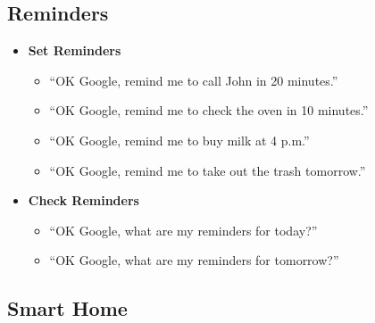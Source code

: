 \documentclass[
  jou,
  floatsintext,
  longtable,
  a4paper,
  nolmodern,
  notxfonts,
  notimes,
  12pt,
  colorlinks=true,linkcolor=blue,citecolor=blue,urlcolor=blue]{apa7}
\providecommand{\tightlist}{%
  \setlength{\itemsep}{0pt}\setlength{\parskip}{0pt}}
\begin{document}
\subsection{Reminders}\label{reminders}

\begin{itemize}
\tightlist
\item
  \textbf{Set Reminders}

  \begin{itemize}
  \tightlist
  \item
    ``OK Google, remind me to call John in 20 minutes.''
  \item
    ``OK Google, remind me to check the oven in 10 minutes.''
  \item
    ``OK Google, remind me to buy milk at 4 p.m.''
  \item
    ``OK Google, remind me to take out the trash tomorrow.''
  \end{itemize}
\item
  \textbf{Check Reminders}

  \begin{itemize}
  \tightlist
  \item
    ``OK Google, what are my reminders for today?''
  \item
    ``OK Google, what are my reminders for tomorrow?''
  \end{itemize}
\end{itemize}

\subsection{Smart Home}\label{smart-home}
\end{document}
